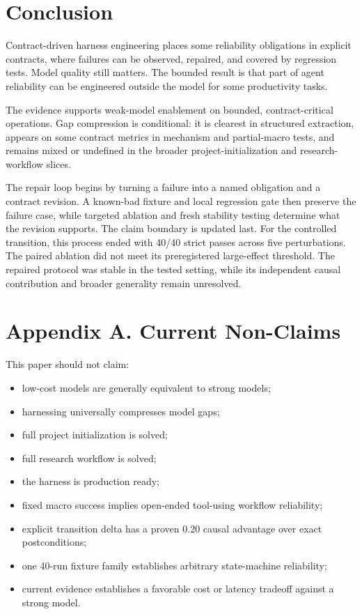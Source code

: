 \documentclass[11pt]{article}
\begin{document}
\section{Conclusion}

Contract-driven harness engineering places some reliability obligations in explicit contracts, where failures can be observed, repaired, and covered by regression tests. Model quality still matters. The bounded result is that part of agent reliability can be engineered outside the model for some productivity tasks.

The evidence supports weak-model enablement on bounded, contract-critical operations. Gap compression is conditional: it is clearest in structured extraction, appears on some contract metrics in mechanism and partial-macro tests, and remains mixed or undefined in the broader project-initialization and research-workflow slices.

The repair loop begins by turning a failure into a named obligation and a contract revision. A known-bad fixture and local regression gate then preserve the failure case, while targeted ablation and fresh stability testing determine what the revision supports. The claim boundary is updated last. For the controlled transition, this process ended with 40/40 strict passes across five perturbations. The paired ablation did not meet its preregistered large-effect threshold. The repaired protocol was stable in the tested setting, while its independent causal contribution and broader generality remain unresolved.

\section{Appendix A. Current Non-Claims}

This paper should not claim:

\begin{itemize}
\item low-cost models are generally equivalent to strong models;
\item harnessing universally compresses model gaps;
\item full project initialization is solved;
\item full research workflow is solved;
\item the harness is production ready;
\item fixed macro success implies open-ended tool-using workflow reliability;
\item explicit transition delta has a proven 0.20 causal advantage over exact postconditions;
\item one 40-run fixture family establishes arbitrary state-machine reliability;
\item current evidence establishes a favorable cost or latency tradeoff against a strong model.
\end{itemize}
\end{document}
